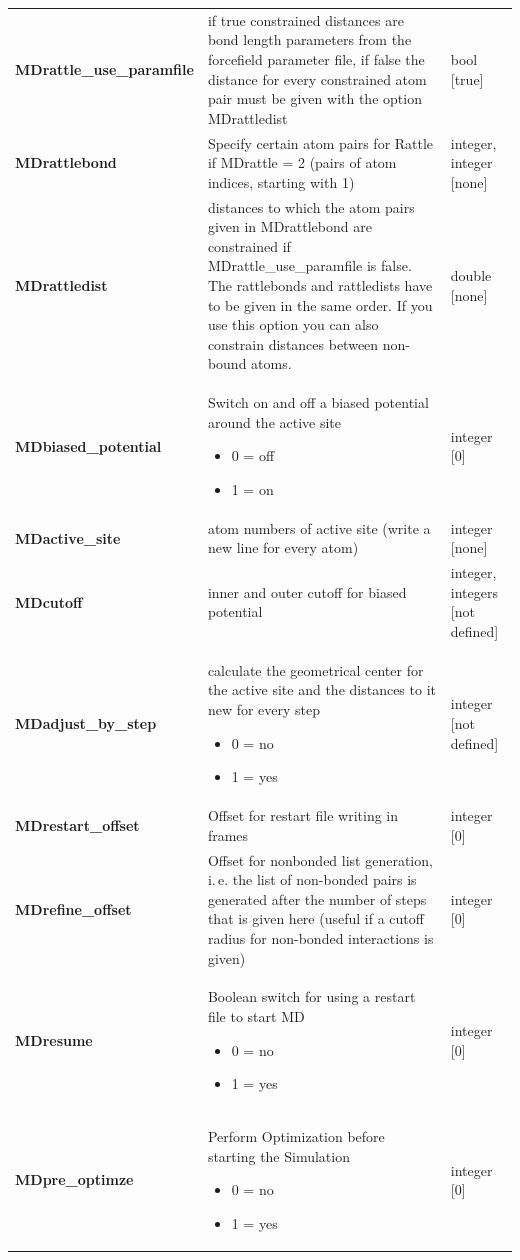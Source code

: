 \documentclass[10pt,a4paper]{article} %
\begin{document}
\begin{longtable}{|p{4cm}|p{4.5cm}|p{3cm}|}
		\textbf{MDrattle\_use\_paramfile} & if true constrained distances are bond length parameters from the forcefield parameter file, if false the distance for every constrained atom pair must be given with the option MDrattledist & bool [true] \\
		\textbf{MDrattlebond} & Specify certain atom pairs for Rattle\supercite{rattle} if MDrattle = 2 (pairs of atom indices, starting with 1) & integer, integer [none] \\
		\textbf{MDrattledist} & distances to which the atom pairs given in MDrattlebond are constrained if MDrattle\_use\_paramfile is false. The rattlebonds and rattledists have to be given in the same order. If you use this option you can also constrain distances between non-bound atoms. & double [none] \\
		\textbf{MDbiased\_potential} & Switch on and off a biased potential around the active site \begin{itemize} \item 0 = off \item 1  = on \end{itemize} & integer [0] \\
		\textbf{MDactive\_site} & atom numbers of active site (write a new line for every atom) & integer [none] \\
		\textbf{MDcutoff} & inner and outer cutoff for biased potential & integer, integers [not defined] \\
		\textbf{MDadjust\_by\_step} & calculate the geometrical center for the active site and the distances to it new for every step \begin{itemize} \item 0 = no \item 1  = yes \end{itemize} & integer [not defined] \\
		\textbf{MDrestart\_offset} & Offset for restart file writing in frames & integer [0] \\
		\textbf{MDrefine\_offset} & Offset for nonbonded list generation, i.\,e. the list of non-bonded pairs is generated after the number of steps that is given here (useful if a cutoff radius for non-bonded interactions is given) & integer [0]  \\
		\textbf{MDresume} & Boolean switch for using a restart file to start MD\begin{itemize} \item 0 = no \item 1 = yes\end{itemize}& integer [0] \\
		\textbf{MDpre\_optimze} & Perform Optimization before starting the Simulation \begin{itemize} \item 0 = no \item 1 = yes\end{itemize}& integer [0] \\
			\end{longtable} 
	
\end{document}

